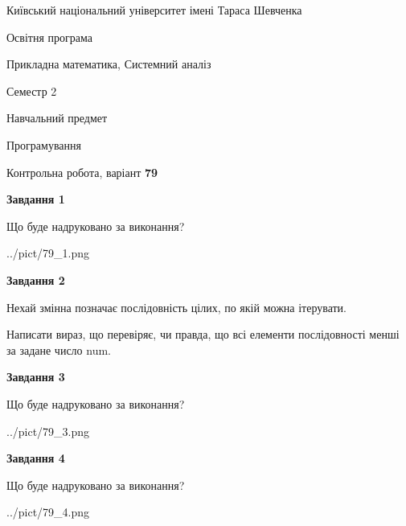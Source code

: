 \documentclass[12pt, ukrainian]{article}
\begin{document}
{{\begin {small}\par
{ \center  Київський національний університет імені Тараса Шевченка \par}
{\parbox {5 cm}{Освітня програма \hfill}{\parbox {8 cm}{Прикладна математика, Системний аналіз \hfill}}\parbox {5 cm}{\hfill Семестр 2}}\par
{\parbox {5 cm} {Навчальний предмет \hfill}\parbox {7 cm}{Програмування \hfill}\parbox {6cm}{\hfill}\par}\vspace{-7pt} \end{small}}{\center Контрольна робота, варіант  \No \textbf
{ 79 }\par}}
{
\begin {large}
{\begin {center}\textbf{Завдання 1}\end {center}}\par
Що буде надруковано за виконання?\par\par
\begin{center}
	{../pict/79_1.png}
\end{center}
\newpage

{\begin {center}\textbf{Завдання 2}\end {center}}\par
Нехай змінна  позначає послідовність цілих, по якій можна ітерувати.

Написати вираз, що перевіряє, чи правда, що всі елементи послідовності менші за задане число num.\par
\newpage

{\begin {center}\textbf{Завдання 3}\end {center}}\par
Що буде надруковано за виконання?\par
\begin{center}
	{../pict/79_3.png}
\end{center}
\newpage

{\begin {center}\textbf{Завдання 4}\end {center}}\par
Що буде надруковано за виконання?\par
\begin{center}
	{../pict/79_4.png}
\end{center}
\newpage


\end{large}}
\end{document}
